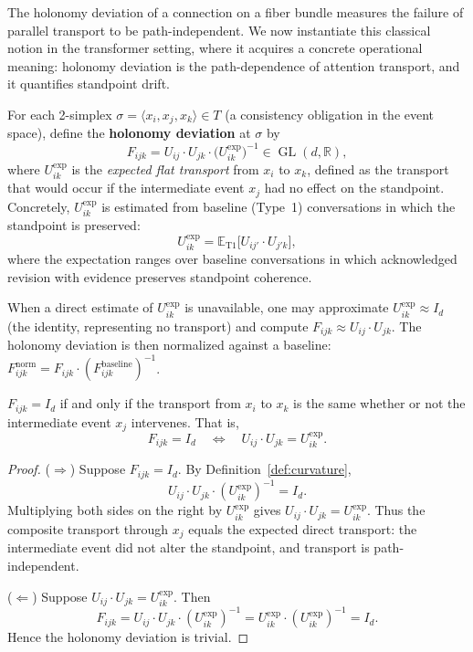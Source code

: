 The holonomy deviation of a connection on a fiber bundle measures the failure of parallel
transport to be path-independent. We now instantiate this classical notion in the
transformer setting, where it acquires a concrete operational meaning: holonomy deviation
is the path-dependence of attention transport, and it quantifies standpoint drift.

\begin{definition}
\label{def:curvature}
For each 2-simplex $\sigma = \langle x_i, x_j, x_k \rangle \in T$ (a consistency
obligation in the event space), define the \textbf{holonomy deviation} at $\sigma$ by
\[
    F_{ijk} = U_{ij} \cdot U_{jk} \cdot \big(U_{ik}^{\exp}\big)^{-1} \in
    \operatorname{GL}(d, \mathbb{R}),
\]
where $U_{ik}^{\exp}$ is the \emph{expected flat transport} from $x_i$ to $x_k$, defined
as the transport that would occur if the intermediate event $x_j$ had no effect on the
standpoint. Concretely, $U_{ik}^{\exp}$ is estimated from baseline (Type~1) conversations
in which the standpoint is preserved:
\[
    U_{ik}^{\exp} = \mathbb{E}_{\text{T1}}\!\big[U_{ij'} \cdot U_{j'k}\big],
\]
where the expectation ranges over baseline conversations in which acknowledged revision
with evidence preserves standpoint coherence.
\end{definition}

\begin{remark}
When a direct estimate of $U_{ik}^{\exp}$ is unavailable, one may approximate
$U_{ik}^{\exp} \approx I_d$ (the identity, representing no transport) and compute
$F_{ijk} \approx U_{ij} \cdot U_{jk}$. The holonomy deviation is then normalized against a
baseline: $F_{ijk}^{\mathrm{norm}} = F_{ijk} \cdot (F_{ijk}^{\mathrm{baseline}})^{-1}$.
\end{remark}

\begin{theorem}
\label{thm:path-dependence}
$F_{ijk} = I_d$ if and only if the transport from $x_i$ to $x_k$ is the same whether or
not the intermediate event $x_j$ intervenes. That is,
\[
    F_{ijk} = I_d \quad\Longleftrightarrow\quad U_{ij} \cdot U_{jk} = U_{ik}^{\exp}.
\]
\end{theorem}

\begin{proof}
($\Rightarrow$) Suppose $F_{ijk} = I_d$. By Definition~\ref{def:curvature},
\[
    U_{ij} \cdot U_{jk} \cdot (U_{ik}^{\exp})^{-1} = I_d.
\]
Multiplying both sides on the right by $U_{ik}^{\exp}$ gives $U_{ij} \cdot U_{jk} =
U_{ik}^{\exp}$. Thus the composite transport through $x_j$ equals the expected direct
transport: the intermediate event did not alter the standpoint, and transport is
path-independent.

($\Leftarrow$) Suppose $U_{ij} \cdot U_{jk} = U_{ik}^{\exp}$. Then
\[
    F_{ijk} = U_{ij} \cdot U_{jk} \cdot (U_{ik}^{\exp})^{-1}
            = U_{ik}^{\exp} \cdot (U_{ik}^{\exp})^{-1} = I_d.
\]
Hence the holonomy deviation is trivial.
\end{proof}


